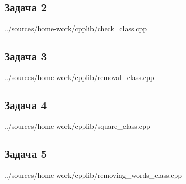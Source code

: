 \documentclass[12pt,a4paper]{report}
\begin{document}
\subsection{Задача 2}

{../sources/home-work/cpplib/check_class.cpp}
\subsection{Задача 3}

{../sources/home-work/cpplib/removal_class.cpp}
\subsection{Задача 4}

{../sources/home-work/cpplib/square_class.cpp}
\subsection{Задача 5}

{../sources/home-work/cpplib/removing_words_class.cpp}
\end{document}
